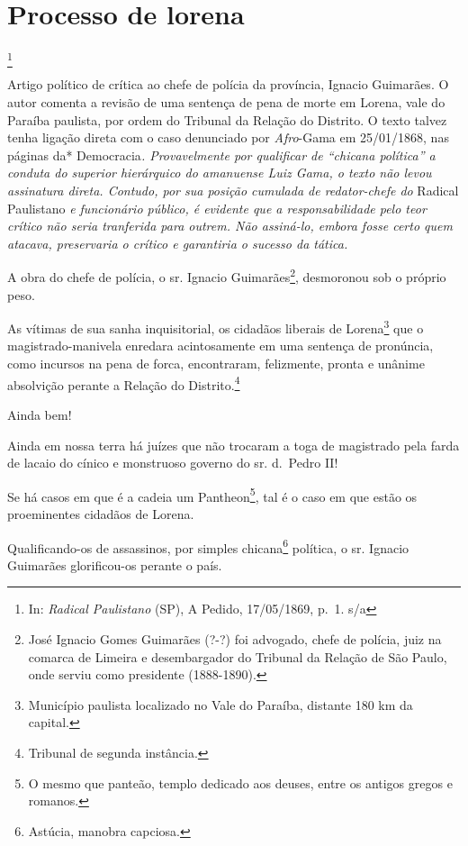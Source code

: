 \chapter{Processo de lorena}\footnote{In: \emph{Radical Paulistano} (SP), A
  Pedido, 17/05/1869, p.~1. s/a}

\begin{didascalia}
Artigo político de crítica ao chefe de polícia da província, Ignacio
Guimarães. O autor comenta a revisão de uma sentença de pena de morte em
Lorena, vale do Paraíba paulista, por ordem do Tribunal da Relação do
Distrito. O texto talvez tenha ligação direta com o caso denunciado
por\emph{ Afro}-Gama em 25/01/1868, nas páginas da* Democracia\emph{.
Provavelmente por qualificar de ``chicana política'' a conduta do superior
hierárquico do amanuense Luiz Gama, o texto não levou assinatura direta.
Contudo, por sua posição cumulada de redator-chefe do} Radical
Paulistano \emph{e funcionário público, é evidente que a
responsabilidade pelo teor crítico não seria tranferida para outrem. Não
assiná-lo, embora fosse certo quem atacava, preservaria o crítico e
garantiria o sucesso da tática.}
\end{didascalia}

\asterisc{}

A obra do chefe de polícia, o sr. Ignacio Guimarães\footnote{José
  Ignacio Gomes Guimarães (?-?) foi advogado, chefe de polícia, juiz na
  comarca de Limeira e desembargador do Tribunal da Relação de São
  Paulo, onde serviu como presidente (1888-1890).}, desmoronou sob o
próprio peso.

As vítimas de sua sanha inquisitorial, os cidadãos liberais de
Lorena\footnote{Município paulista localizado no Vale do Paraíba,
  distante 180 km da capital.} que o magistrado-manivela enredara
acintosamente em uma sentença de pronúncia, como incursos na pena de
forca, encontraram, felizmente, pronta e unânime absolvição perante a
Relação do Distrito.\footnote{Tribunal de segunda instância.}

Ainda bem!

Ainda em nossa terra há juízes que não trocaram a toga de magistrado
pela farda de lacaio do cínico e monstruoso governo do sr. d.~Pedro II!

Se há casos em que é a cadeia um Pantheon\footnote{O mesmo que
  panteão, templo dedicado aos deuses, entre os antigos gregos e
  romanos.}, tal é o caso em que estão os proeminentes cidadãos de
Lorena.

Qualificando-os de assassinos, por simples chicana\footnote{Astúcia,
  manobra capciosa.} política, o sr. Ignacio Guimarães glorificou-os
perante o país.

